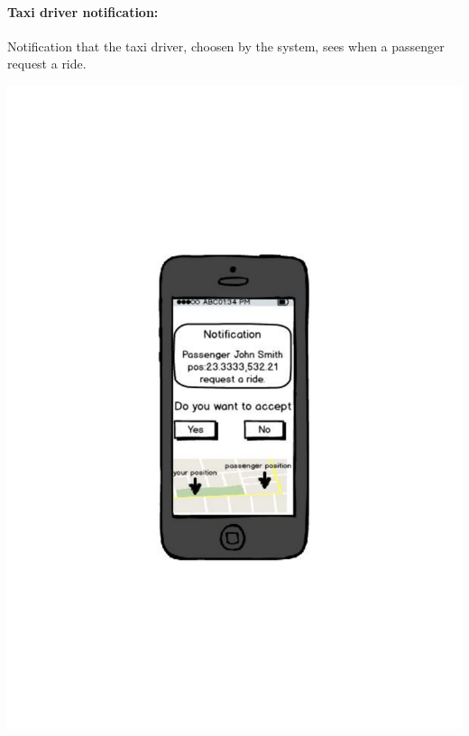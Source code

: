 \paragraph{Taxi driver notification:}
Notification that the taxi driver, choosen by the system, sees when a passenger request a ride.
\begin{center}
	\includegraphics[width=\textwidth]{mockup/taxiDriverNotification.pdf}
\end{center}
